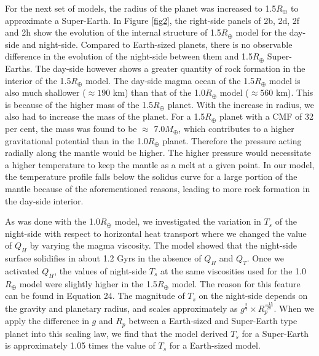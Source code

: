 \documentclass[fleqn,usenatbib]{mnras}
\begin{document}
For the next set of models, the radius of the planet was increased to 1.5$R_{\oplus}$ to approximate a Super-Earth. In Figure \ref{fig2}, the right-side panels of 2b, 2d, 2f and 2h show the evolution of the internal structure of 1.5$R_{\oplus}$ model for the day-side and night-side. Compared to Earth-sized planets, there is no observable difference in the evolution of the night-side between them and 1.5$R_{\oplus}$ Super-Earths. The day-side however shows a greater quantity of rock formation in the interior of the 1.5$R_{\oplus}$ model. The day-side magma ocean of the 1.5$R_{\oplus}$ model is also much shallower ($\approx 190$ km) than that of the 1.0$R_{\oplus}$ model ($\approx 560$ km). This is because of the higher mass of the 1.5$R_{\oplus}$ planet. With the increase in radius, we also had to increase the mass of the planet. For a 1.5$R_{\oplus}$ planet with a CMF of 32 per cent, the mass was found to be $\approx$ 7.0$M_{\oplus}$, which contributes to a higher gravitational potential than in the 1.0$R_{\oplus}$ planet. Therefore the pressure acting radially along the mantle would be higher. The higher pressure would necessitate a higher temperature to keep the mantle as a melt at a given point. In our model, the temperature profile falls below the solidus curve for a large portion of the mantle because of the aforementioned reasons, leading to more rock formation in the day-side interior. 

As was done with the 1.0$R_{\oplus}$ model, we investigated the variation in $T_{s}$ of the night-side with respect to horizontal heat transport where we changed the value of $Q_{H}$ by varying the magma viscosity. The model showed that the night-side surface solidifies in about 1.2 Gyrs in the absence of $Q_{H}$ and $Q_{T}$. Once we activated $Q_{H}$, the values of night-side $T_{s}$ at the same viscosities used for the 1.0$R_{\oplus}$ model were slightly higher in the 1.5$R_{\oplus}$ model. The reason for this feature can be found in Equation 24. The magnitude of $T_{s}$ on the night-side depends on the gravity and planetary radius, and scales approximately as $g^{\frac{2}{7}} \times R_{p}^{\frac{-15}{28}}$. When we apply the difference in $g$ and $R_{p}$ between a Earth-sized and Super-Earth type planet into this scaling law, we find that the model derived $T_{s}$ for a Super-Earth is approximately 1.05 times the value of $T_{s}$ for a Earth-sized model.
\end{document}
